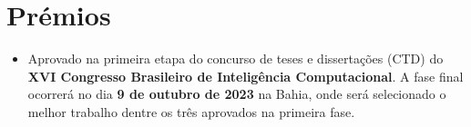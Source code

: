 \section{Prémios}

\begin{itemize}

\item Aprovado na primeira etapa do concurso de teses e dissertações (CTD) do \textbf{XVI Congresso Brasileiro de Inteligência Computacional}. A fase final ocorrerá no dia \textbf{9 de outubro de 2023} na Bahia, onde será selecionado o melhor trabalho dentre os três aprovados na primeira fase.


\end{itemize}